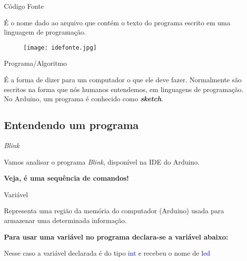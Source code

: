 \begin{frame}{Código Fonte}
	\begin{block}{}
		É o nome dado ao arquivo que contém o texto do programa escrito em uma linguagem de programação.
	\end{block}
	
	\begin{figure}[H]
		\texttt{[image: idefonte.jpg]}\footnotemark
	\end{figure}
	
\end{frame}

\begin{frame}{Programa/Algoritmo}
	\begin{block}{}
		É a forma de dizer para um computador o que ele deve fazer. Normalmente são escritos na forma que nós humanos entendemos, em linguagens de programação. No Arduino, um programa é conhecido como \textbf{\textit{sketch}}.
	\end{block}
\end{frame}

\subsection*{Entendendo um programa}
\begin{frame}{\textit{Blink}}
	\begin{block}{}
		Vamos analisar o programa \textit{Blink}, disponível na IDE do Arduino.
	\end{block}
	
	\centering\textbf{Veja, é uma sequência de comandos!}
	
	
\end{frame}

\begin{frame}{Variável}
	\begin{block}{}
		Representa uma região da memória do computador (Arduino) usada para armazenar uma determinada informação\footnotemark.
	\end{block}
	
	\vspace{2em}
	\centering\textbf{Para usar uma variável no programa declara-se a variável abaixo:}
	
	
	
	\begin{block}{}
		Nesse caso a variável declarada é do tipo \textcolor{blue}{int} e recebeu o nome de \textcolor{blue}{led}
	\end{block}
	
\end{frame}

